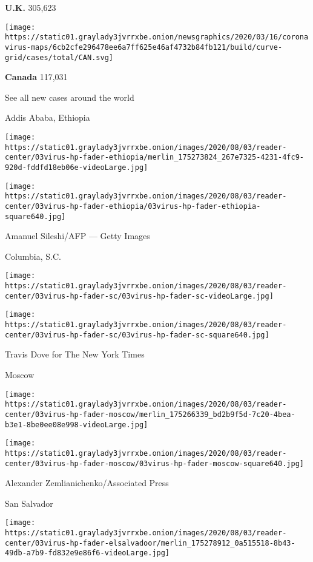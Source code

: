 \textbf{U.K.} 305,623
\href{https://www.nytimes3xbfgragh.onion/interactive/2020/world/canada/canada-coronavirus-cases.html}{}

\texttt{[image: https://static01.graylady3jvrrxbe.onion/newsgraphics/2020/03/16/coronavirus-maps/6cb2cfe296478ee6a7ff625e46af4732b84fb121/build/curve-grid/cases/total/CAN.svg]}

\textbf{Canada} 117,031

\href{https://www.nytimes3xbfgragh.onion/interactive/2020/world/coronavirus-maps.html}{}

See all new cases around the world

\href{https://www.nytimes3xbfgragh.onion/2020/08/03/world/coronavirus-covid-19.html}{}

Addis Ababa, Ethiopia

\texttt{[image: https://static01.graylady3jvrrxbe.onion/images/2020/08/03/reader-center/03virus-hp-fader-ethiopia/merlin\_175273824\_267e7325-4231-4fc9-920d-fddfd18eb06e-videoLarge.jpg]}

\texttt{[image: https://static01.graylady3jvrrxbe.onion/images/2020/08/03/reader-center/03virus-hp-fader-ethiopia/03virus-hp-fader-ethiopia-square640.jpg]}

 Amanuel Sileshi/AFP --- Getty Images

Columbia, S.C.

\texttt{[image: https://static01.graylady3jvrrxbe.onion/images/2020/08/03/reader-center/03virus-hp-fader-sc/03virus-hp-fader-sc-videoLarge.jpg]}

\texttt{[image: https://static01.graylady3jvrrxbe.onion/images/2020/08/03/reader-center/03virus-hp-fader-sc/03virus-hp-fader-sc-square640.jpg]}

 Travis Dove for The New York Times

Moscow

\texttt{[image: https://static01.graylady3jvrrxbe.onion/images/2020/08/03/reader-center/03virus-hp-fader-moscow/merlin\_175266339\_bd2b9f5d-7c20-4bea-b3e1-8be0ee08e998-videoLarge.jpg]}

\texttt{[image: https://static01.graylady3jvrrxbe.onion/images/2020/08/03/reader-center/03virus-hp-fader-moscow/03virus-hp-fader-moscow-square640.jpg]}

 Alexander Zemlianichenko/Associated Press

San Salvador

\texttt{[image: https://static01.graylady3jvrrxbe.onion/images/2020/08/03/reader-center/03virus-hp-fader-elsalvadoor/merlin\_175278912\_0a515518-8b43-49db-a7b9-fd832e9e86f6-videoLarge.jpg]}

